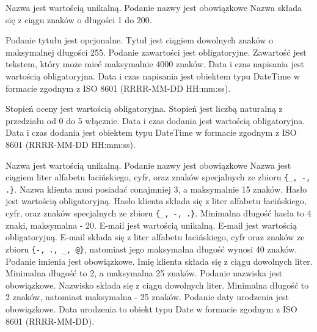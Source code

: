 \begin{ograniczenia}
	\ograniczenie Nazwa jest wartością unikalną.
	\ograniczenie Podanie nazwy jest obowiązkowe
    \ograniczenie Nazwa składa się z ciągu znaków o długości 1 do 200.
\end{ograniczenia}

\begin{ograniczenia}
    \ograniczenie Podanie tytułu jest opcjonalne.
    \ograniczenie Tytuł jest ciągiem dowolnych znaków o maksymalnej długości 255.
    \ograniczenie Podanie zawartości jest obligatoryjne.
    \ograniczenie Zawartość jest tekstem, który może mieć maksymalnie 4000 znaków.
    \ograniczenie Data i czas napisania jest wartością obligatoryjna.
    \ograniczenie Data i czas napisania jest obiektem typu DateTime w formacie zgodnym z ISO 8601 (RRRR-MM-DD HH:mm:ss).
\end{ograniczenia}

\begin{ograniczenia}
    \ograniczenie Stopień oceny jest wartością obligatoryjna.
    \ograniczenie Stopień jest liczbą naturalną z przedziału od 0 do 5 włącznie.
    \ograniczenie Data i czas dodania jest wartością obligatoryjna.
    \ograniczenie Data i czas dodania jest obiektem typu DateTime w formacie zgodnym z ISO 8601 (RRRR-MM-DD HH:mm:ss).
\end{ograniczenia}

\begin{ograniczenia}
	\ograniczenie Nazwa jest wartością unikalną.
	\ograniczenie Podanie nazwy jest obowiązkowe
    \ograniczenie Nazwa jest ciągiem liter alfabetu łacińskiego, cyfr, oraz znaków specjalnych ze zbioru \verb+{_, -, .}+.
    \ograniczenie Nazwa klienta musi posiadać conajmniej 3, a maksymalnie 15 znaków.
	\ograniczenie Hasło jest wartością obligatoryjną.
    \ograniczenie Hasło klienta składa się z liter alfabetu łacińskiego, cyfr, oraz znaków specjalnych ze zbioru \verb+{_, -, .}+.
    \ograniczenie Minimalna długość hasła to 4 znaki, maksymalna - 20.
	\ograniczenie E-mail jest wartością unikalną.
	\ograniczenie E-mail jest wartością obligatoryjną.
    \ograniczenie E-mail składa się z liter alfabetu łacińskiego, cyfr oraz znaków ze zbioru \verb+{-, ., _, @}+, natomiast jego maksymalna długość wynosi 40 znaków.
	\ograniczenie Podanie imienia jest obowiązkowe.
    \ograniczenie Imię klienta składa się z ciągu dowolnych liter. Minimalna długość to 2, a maksymalna 25 znaków.
	\ograniczenie Podanie nazwiska jest obowiązkowe.
    \ograniczenie Nazwisko składa się z ciągu dowolnych liter. Minimalna długość to 2 znaków, natomiast maksymalna - 25 znaków.
	\ograniczenie Podanie daty urodzenia jest obowiązkowe.
    \ograniczenie Data urodzenia to obiekt typu Date w formacie zgodnym z ISO 8601 (RRRR-MM-DD).
\end{ograniczenia}

